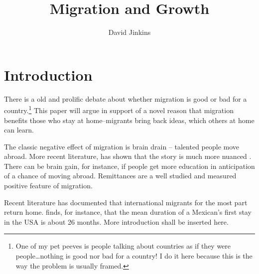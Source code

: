 \documentclass[12pt]{article}
\title{Migration and Growth}
\author{David Jinkins}
\begin{document}
\maketitle

\section{Introduction}

There is a old and prolific debate about whether migration is good or bad for a country.\footnote{One of my pet peeves is people talking about countries as if they were people\dots nothing is good nor bad for a country! I do it here because this is the way the problem is usually framed.}  This paper will argue in support of a novel reason that migration benefits those who stay at home--migrants bring back ideas, which others at home can learn.

The classic negative effect of migration is brain drain -- talented people move abroad.  More recent literature, has shown that the story is much more nuanced \citep{Beineetal2001}.  There can be brain gain, for instance, if people get more education in anticipation of a chance of moving abroad.  Remittances are a well studied and measured positive feature of migration.

Recent literature has documented that international migrants for the most part return home.  \citet{Carrion-Flores2006} finds, for instance, that the mean duration of a Mexican's first stay in the USA is about 26 months.  More introduction shall be inserted here.


\end{document}
